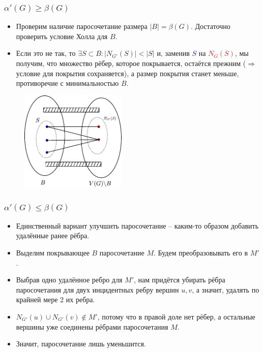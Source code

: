 \begin{frame}[t]
    \small
    \frametitle{$\alpha'(G) \geq \beta(G)$}
    \begin{itemize}
        \item Проверим наличие паросочетание размера $|B| = \beta(G)$. Достаточно проверить условие Холла для $B$.
        \item Если это не так, то $\exists S \subset B: |N_{G'}(S)| < |S|$ и, заменив \textcolor{blue}{$S$} на \textcolor{red}{$N_G(S)$}, мы получим, что множество рёбер, которое покрывается, остаётся прежним ($ \Rightarrow $ условие для покрытия сохраняется), а размер покрытия станет меньше, противоречие с минимальностью $B$. 
    \end{itemize}
    \vspace{-5mm}
    \begin{figure}[h]
        \centering
        \includegraphics[width=0.45\textwidth]{images/hall}
        \label{fig:hall}
    \end{figure}
    
\end{frame}

\begin{frame}[t]
    \small
    \frametitle{$\alpha'(G) \leq \beta(G)$}

    \begin{itemize}
        \item Единственный вариант улучшить паросочетание -- каким-то образом добавить удалённые ранее рёбра. 
        \item Выделим покрывающее $B$ паросочетание $M$. Будем преобразовывать его в $M'$.
        \item Выбрав одно удалённое ребро для $M'$, нам придётся убирать рёбра паросочетания для двух инцидентных ребру вершин $u, v$, а значит, удалять по крайней мере 2 их ребра. 
        \item  $N_{G'}(u) \cup N_{G'}(v) \notin M'$, потому что в правой доле нет рёбер, а остальные вершины уже соединены рёбрами паросочетания $M$. 
        \item Значит, паросочетание лишь уменьшится.
    \hfill \qedsymbol{}
    \end{itemize}
\end{frame}

